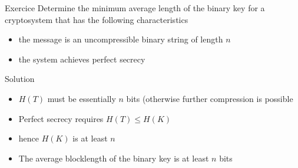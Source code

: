 
\begin{parag}{Exercice}
    Determine the minimum average length of the binary key for a cryptosystem that has the following characteristics
\begin{itemize}
    \item the message is an uncompressible binary string of length $n$
    \item the system achieves perfect secrecy
\end{itemize}
\begin{subparag}{Solution}
    \begin{itemize}
        \item $H(T)$ must be essentially $n$ bits (otherwise further compression is possible
        \item Perfect secrecy requires $H(T) \leq H(K)$
        \item  hence $H(K)$ is at least $n$
        \item The average blocklength of the binary key is at least $n$ bits
    \end{itemize}
\end{subparag}
\end{parag}



